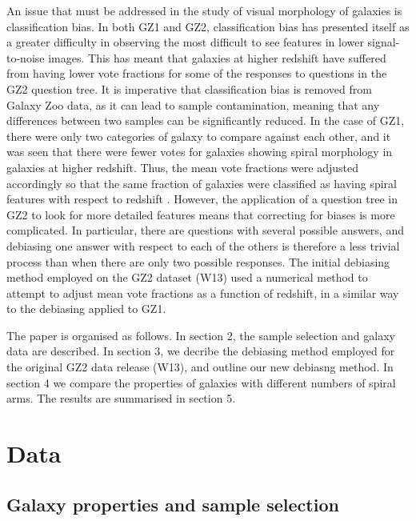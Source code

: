\documentclass[useAMS,usenatbib]{mn2e}
\begin{document}
An issue that must be addressed in the study of visual morphology of galaxies is classification bias. In both GZ1 and GZ2, classification bias has presented itself as a greater difficulty in observing the most difficult to see features in lower signal-to-noise images. This has meant that galaxies at higher redshift have suffered from having lower vote fractions for some of the responses to questions in the GZ2 question tree. It is imperative that classification bias is removed from Galaxy Zoo data, as it can lead to sample contamination, meaning that any differences between two samples can be significantly reduced. In the case of GZ1, there were only two categories of galaxy to compare against each other, and it was seen that there were fewer votes for galaxies showing spiral morphology in galaxies at higher redshift. Thus, the mean vote fractions were adjusted accordingly so that the same fraction of galaxies were classified as having spiral features with respect to redshift \citep{Bamford_09}. However, the application of a question tree in GZ2 to look for more detailed features means that correcting for biases is more complicated. In particular, there are questions with several possible answers, and debiasing one answer with respect to each of the others is therefore a less trivial process than when there are only two possible responses. The initial debiasing method employed on the GZ2 dataset (W13) used a numerical method to attempt to adjust mean vote fractions as a function of redshift, in a similar way to the debiasing applied to GZ1.

The paper is organised as follows. In section 2, the sample selection and galaxy data are described. In section 3, we decribe the debiasing method employed for the original GZ2 data release (W13), and outline our new debiasng method. In section 4 we compare the properties of galaxies with different numbers of spiral arms. The results are summarised in section 5. 

\section{Data}
\label{sec:data}
\subsection{Galaxy properties and sample selection}
\label{sec:sample}
\end{document}
